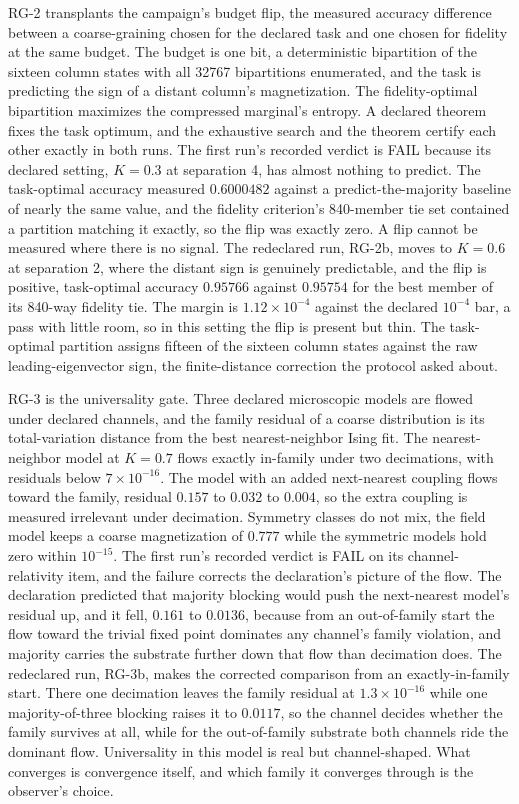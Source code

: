 \documentclass[aps,pre,reprint,nofootinbib,floatfix]{revtex4-2}
\begin{document}
RG-2 transplants the campaign's budget flip, the measured accuracy
difference between a coarse-graining chosen for the declared task
and one chosen for fidelity at the same budget.  The budget is one
bit, a deterministic bipartition of the sixteen column states with
all 32767 bipartitions enumerated, and the task is predicting the
sign of a distant column's magnetization.  The fidelity-optimal
bipartition maximizes the compressed marginal's entropy.  A
declared theorem fixes the task optimum, and the exhaustive search
and the theorem certify each other exactly in both runs.  The first
run's recorded verdict is FAIL because its declared setting, $K=0.3$
at separation 4, has almost nothing to predict.  The task-optimal
accuracy measured $0.6000482$ against a predict-the-majority
baseline of nearly the same value, and
the fidelity criterion's 840-member tie set contained a partition
matching it exactly, so the flip was exactly zero.  A flip cannot
be measured where there is no signal.  The redeclared run, RG-2b,
moves to $K=0.6$ at separation 2, where the distant sign is
genuinely predictable, and the flip is positive, task-optimal
accuracy $0.95766$ against $0.95754$ for the best member of its
840-way fidelity tie.  The margin is $1.12\times10^{-4}$ against
the declared $10^{-4}$ bar, a pass with little room, so in this
setting the flip is present but thin.  The task-optimal partition
assigns fifteen of the sixteen column states against the raw
leading-eigenvector sign, the finite-distance correction the
protocol asked about.

RG-3 is the universality gate.  Three declared microscopic models
are flowed under declared channels, and the family residual of a
coarse distribution is its total-variation distance from the best
nearest-neighbor Ising fit.  The nearest-neighbor model at $K=0.7$
flows exactly in-family under two decimations, with residuals below
$7\times10^{-16}$.  The model with an added next-nearest coupling
flows toward the family, residual $0.157$ to $0.032$ to $0.004$,
so the extra coupling is measured irrelevant under decimation.
Symmetry classes do not mix, the field model keeps a coarse
magnetization of $0.777$ while the symmetric models hold zero
within $10^{-15}$.  The first run's recorded verdict is FAIL on its
channel-relativity item, and the failure corrects the declaration's
picture of the flow.  The declaration predicted that majority
blocking would push the next-nearest model's residual up, and it
fell, $0.161$ to $0.0136$, because from an out-of-family start the
flow toward the trivial fixed point dominates any channel's
family violation, and majority carries the substrate further down
that flow than decimation does.  The redeclared run, RG-3b, makes
the corrected comparison from an exactly-in-family start.  There
one decimation leaves the family residual at $1.3\times10^{-16}$
while one majority-of-three blocking raises it to $0.0117$, so the
channel decides whether the family survives at all, while for the
out-of-family substrate both channels ride the dominant flow.
Universality in this model is real but channel-shaped.  What
converges is convergence itself, and which family it converges
through is the observer's choice.
\end{document}
